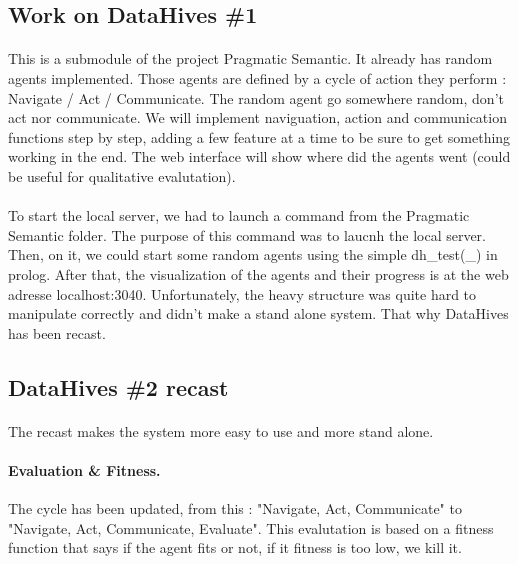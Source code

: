\documentclass{article}
\begin{document}
	\subsection{Work on DataHives \#1}
		\paragraph{} This is a submodule of the project Pragmatic Semantic.
		It already has random agents implemented.
		Those agents are defined by a cycle of action they perform : Navigate / Act / Communicate.
		The random agent go somewhere random, don't act nor communicate.
		We will implement naviguation, action and communication functions step by step,
		adding a few feature at a time to be sure to get something working in the end.
		The web interface will show where did the agents went (could be useful for qualitative evalutation).
		\paragraph{} To start the local server, we had to launch a command from the Pragmatic Semantic folder.
		The purpose of this command was to laucnh the local server.
		Then, on it, we could start some random agents using the simple dh\_test(\_) in prolog.
		After that, the visualization of the agents and their progress is at the web adresse localhost:3040.
		Unfortunately, the heavy structure was quite hard to manipulate correctly and didn't make a stand alone system.
		That why DataHives has been recast.
	\subsection{DataHives \#2 recast}
		\paragraph{} The recast makes the system more easy to use and more stand alone.
		\paragraph{Evaluation \& Fitness.} The cycle has been updated, from this :
			"Navigate, Act, Communicate" to "Navigate, Act, Communicate, Evaluate".
			This evalutation is based on a fitness function that says if the agent fits or not,
			if it fitness is too low, we kill it.

\newpage
\end{document}
